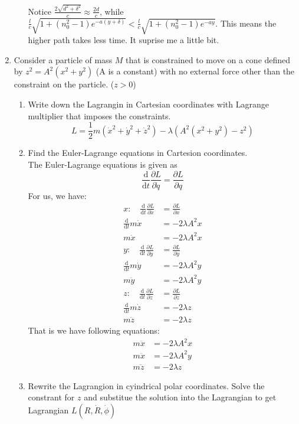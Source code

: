 \documentclass{article}
\newcommand{\de}{\mathrm{d}}
\begin{document}
\begin{enumerate}
\begin{enumerate}
        Notice $\frac{2\sqrt{d^2 + \delta ^2}}{c} \approx \frac{2d}{c}$, while $\frac{l}{c} \sqrt{1+(n_0^2-1)e^{-a(y + \delta)}}< \frac{l}{c} \sqrt{1+(n_0^2-1)e^{-ay}}$. This means the higher path takes less time. It suprise me a little bit.

    \end{enumerate}
    \item Consider a particle of mass $M$ that is constrained to move on a cone defined by $z^2 = A^2(x^2+y^2)$ (A is a constant) with no external force other than the constraint on the particle. ($z > 0$)
    \begin{enumerate}
        \item Write down the Lagrangin in Cartesian coordinates with Lagrange multiplier that imposes the constraints.\\

        \[
        L = \frac{1}{2}m(\dot x^2 + \dot y^2 + \dot z^2) - \lambda (A^2(x^2+y^2) - z^2)
        \]

        \item  Find the Euler-Lagrange equations in Cartesion coordinates.\\

        The Euler-Lagrange equations is given as
        \[
        \frac{\de}{\de t}\frac{\partial L}{\partial \dot q} = \frac{\partial L}{\partial q}
        \]
        For us, we have:
        \begin{align*}
            x: \quad \frac{\de}{\de t}\frac{\partial L}{\partial \dot x} &= \frac{\partial L}{\partial x}\\
                     \frac{\de}{\de t}m\dot x &= -2\lambda A^2 x\\
                     m\ddot x &= -2\lambda A^2 x\\
            y: \quad \frac{\de}{\de t}\frac{\partial L}{\partial \dot y} &= \frac{\partial L}{\partial y}\\
                     \frac{\de}{\de t}m\dot y &= -2\lambda A^2 y \\
                     m\ddot y &= -2\lambda A^2 y\\
            z: \quad \frac{\de}{\de t}\frac{\partial L}{\partial \dot z} &= \frac{\partial L}{\partial z}\\
                     \frac{\de}{\de t}m\dot z &= -2\lambda z\\
                     m\ddot z &= -2\lambda z
        \end{align*}
        That is we have following equations:
        \begin{align*}
            m\ddot x &= -2\lambda A^2 x\\
            m\ddot x &= -2\lambda A^2 y\\
            m\ddot z &= -2\lambda z
        \end{align*}
        \item Rewrite the Lagrangion in cyindrical polar coordinates. Solve the constrant for $z$ and substitue the solution into the Lagrangian to get Lagrangian $L(R,\dot R, \dot \phi)$\\


\end{enumerate}
\end{enumerate}
\end{document}

